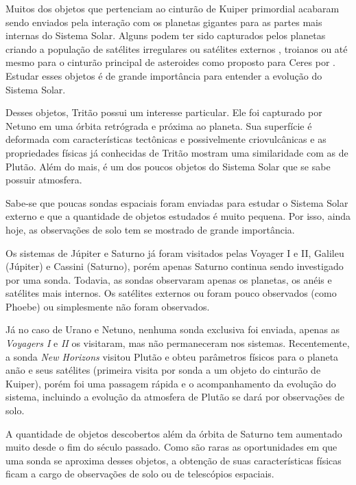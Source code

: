 \documentclass[12pt,a4paper]{report}
\begin{document}
Muitos dos objetos que pertenciam ao cinturão de Kuiper primordial acabaram sendo enviados pela interação com os planetas gigantes para as partes mais internas do Sistema Solar. Alguns podem ter sido capturados pelos planetas criando a população de satélites irregulares ou satélites externos \citep{Nesvorny2007}, troianos \citep{Morbidelli2005} ou até mesmo para o cinturão principal de asteroides como proposto para Ceres por \cite{McKinnon2012}. Estudar esses objetos é de grande importância para entender a evolução do Sistema Solar.

Desses objetos, Tritão possui um interesse particular. Ele foi capturado por Netuno \citep{McKinnon2007} em uma órbita retrógrada e próxima ao planeta. Sua superfície é deformada com características tectônicas e possivelmente criovulcânicas \citep{Nimmo2015} e as propriedades físicas já conhecidas de Tritão mostram uma similaridade com as de Plutão. Além do mais, é um dos poucos objetos do Sistema Solar que se sabe possuir atmosfera.

Sabe-se que poucas sondas espaciais foram enviadas para estudar o Sistema Solar externo e que a quantidade de objetos estudados é muito pequena. Por isso, ainda hoje, as observações de solo tem se mostrado de grande importância.

Os sistemas de Júpiter e Saturno já foram visitados pelas Voyager I e II, Galileu (Júpiter) e Cassini (Saturno), porém apenas Saturno continua sendo investigado por uma sonda. Todavia, as sondas observaram apenas os planetas, os anéis e satélites mais internos. Os satélites externos ou foram pouco observados (como Phoebe) ou simplesmente não foram observados.

Já no caso de Urano e Netuno, nenhuma sonda exclusiva foi enviada, apenas as \textit{Voyagers I} e \textit{II} os visitaram, mas não permaneceram nos sistemas. Recentemente, a sonda \textit{New Horizons} visitou Plutão \citep{Stern2015} e obteu parâmetros físicos para o planeta anão e seus satélites (primeira visita por sonda a um objeto do cinturão de Kuiper), porém foi uma passagem rápida e o acompanhamento da evolução do sistema, incluindo a evolução da atmosfera de Plutão se dará por observações de solo.

A quantidade de objetos descobertos além da órbita de Saturno tem aumentado muito desde o fim do século passado. Como são raras as oportunidades em que uma sonda se aproxima desses objetos, a obtenção de suas características físicas ficam a cargo de observações de solo ou de
telescópios espaciais.
\end{document}
